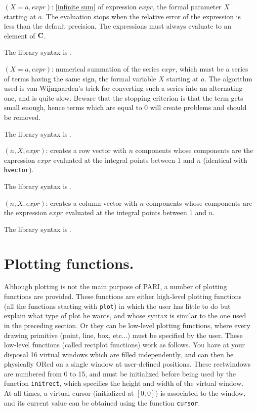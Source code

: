 $(X=a,expr)$: \ref{infinite sum} of expression $expr$, the 
formal parameter $X$ starting at $a$. The evaluation stops when the relative
error of the expression is less than the default precision. The expressions
must always evaluate to an element of $\Bbb C$.

The library syntax is .

$(X=a,expr)$: numerical summation of the series $expr$,
which must be a series of terms having the same sign, the formal variable $X$
starting at $a$. The algorithm used is van Wijngaarden's
trick for converting such a series into an alternating one, and is quite slow.
Beware that the stopping criterion is that the term gets small enough, hence
terms which are equal to 0 will create problems and should be removed.

The library syntax is .

$(n,X,expr)$: creates a row vector with $n$ components
whose components are the expression $expr$ evaluated at the integral points
between 1 and $n$ (identical with {\tt hvector}).

The library syntax is .

$(n,X,expr)$: creates a column vector with $n$ components
whose components are the expression $expr$ evaluated at the integral points
between 1 and $n$.

The library syntax is .

\section{Plotting functions.}

Although plotting is not the main purpose of PARI, a number of plotting
functions are provided. These functions are either high-level plotting
functions (all the functions starting with {\tt plot}) in which the user
has little to do but explain what type of plot he wants, and whose syntax
is similar to the one used in the preceding section. Or they can be low-level
plotting functions, where every drawing primitive (point, line, box, etc...)
must be specified by the user. These low-level functions (called rectplot 
functions) work as follows. You have at your disposal 16 virtual windows which
are filled independently, and can then be physically ORed on a single window at
user-defined positions. These rectwindows are numbered from 0 to 15, and must
be initialized before being used by the function {\tt initrect}, which 
specifies the height and width of the virtual window. At all times, a virtual
cursor (initialized at $[0,0]$) is associated to the window, and its current
value can be obtained using the function {\tt cursor}.

